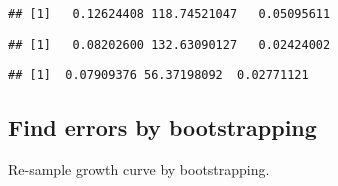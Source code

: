 \documentclass[]{article}
\newenvironment{Shaded}{\begin{snugshade}}{\end{snugshade}}
\newcommand{\KeywordTok}[1]{\textcolor[rgb]{0.13,0.29,0.53}{\textbf{#1}}}
\newcommand{\DecValTok}[1]{\textcolor[rgb]{0.00,0.00,0.81}{#1}}
\newcommand{\StringTok}[1]{\textcolor[rgb]{0.31,0.60,0.02}{#1}}
\newcommand{\OperatorTok}[1]{\textcolor[rgb]{0.81,0.36,0.00}{\textbf{#1}}}
\newcommand{\NormalTok}[1]{#1}
\begin{document}
\begin{verbatim}
## [1]   0.12624408 118.74521047   0.05095611
\end{verbatim}

\begin{Shaded}
\end{Shaded}

\begin{verbatim}
## [1]   0.08202600 132.63090127   0.02424002
\end{verbatim}

\begin{Shaded}
\end{Shaded}

\begin{verbatim}
## [1]  0.07909376 56.37198092  0.02771121
\end{verbatim}

\subsection{Find errors by
bootstrapping}\label{find-errors-by-bootstrapping}

Re-sample growth curve by bootstrapping.
\end{document}
